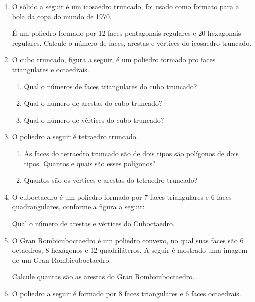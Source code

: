 \documentclass[twocolumn,oneside,a4paper,12pt]{article}
\begin{document}
\begin{enumerate}
\item O sólido a seguir é um icosaedro truncado, foi usado como formato para a bola da copa do mundo de 1970.


É um poliedro formado por 12 faces pentagonais regulares e 20 hexagonais regulares. Calcule o número de faces, arestas e vértices do icosaedro truncado.

\item O cubo truncado, figura a seguir, é um poliedro formado pro faces triangulares e octaedrais.

\begin{enumerate}
\item Qual o números de faces triangulares do cubo truncado?
\item Qual o número de arestas do cubo truncado?
\item Qual o número de vértices do cubo truncado?
\end{enumerate}

\item O poliedro a seguir é tetraedro truncado.

\begin{enumerate}
\item As faces do tetraedro truncado são de dois tipos são polígonos de dois tipos. Quantos e quais são esses polígonos?
\item Quantos são os vértices e arestas do tetraedro truncado?
\end{enumerate}

\item O cuboctaedro é um poliedro formado por 7 faces triangulares e 6 faces quadrangulares, conforme a figura a seguir:

Qual o número de arestas e vértices do Cuboctaedro.

\item O Gran Rombicuboctaedro é um poliedro convexo, no qual suas faces são 6 octaedros, 8 hexágonos e 12 quadriláteros. A seguir é mostrado uma imagem de um Gran Rombicuboctaedro:


Calcule quantas são as arestas do Gran Rombicuboctaedro.

\item O poliedro a seguir é formado por 8 faces triangulares e 6 faces octaedrais.


\end{enumerate}
\end{document}
